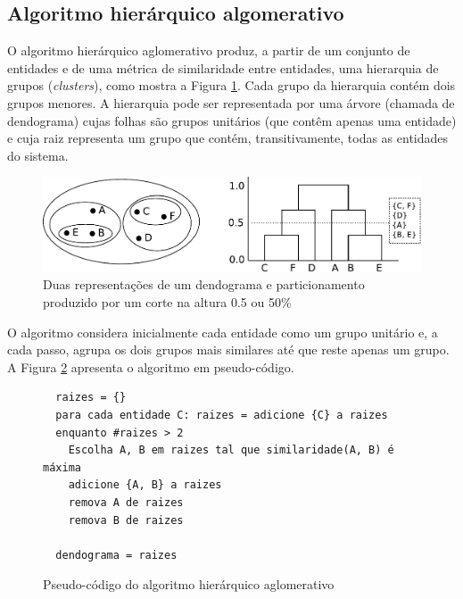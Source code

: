 \subsection{Algoritmo hierárquico algomerativo} \label{sec:aha}

O algoritmo hierárquico aglomerativo produz, a partir de um conjunto
de entidades e de uma métrica de similaridade entre entidades, uma hierarquia
de grupos (\emph{clusters}), como mostra a Figura \ref{fig:dendograma}. 
Cada grupo da hierarquia contém dois grupos menores.
A hierarquia pode ser
representada por uma árvore (chamada de dendograma) cujas folhas
são grupos unitários (que contêm apenas uma entidade) e cuja raiz
representa um grupo que contém, transitivamente, todas as entidades do
sistema.


\begin{figure}[ht] \label{fig:dendograma}
\begin{centering}
  \includegraphics[width=1.0\textwidth]{fig_dendograma}
  \caption{Duas representações de um dendograma e particionamento produzido
  por um corte na altura 0.5 ou 50\%}
\end{centering}
\end{figure}

O algoritmo considera inicialmente cada entidade como um grupo unitário e, a 
cada passo, agrupa os dois grupos mais similares até que reste apenas um
grupo. A Figura \ref{fig:algoritmo} apresenta o algoritmo em pseudo-código.

\begin{figure}[ht] \label{fig:algoritmo}
\begin{centering}
  \begin{verbatim}
  raizes = {}
  para cada entidade C: raizes = adicione {C} a raizes
  enquanto #raizes > 2
    Escolha A, B em raizes tal que similaridade(A, B) é máxima
    adicione {A, B} a raizes
    remova A de raizes
    remova B de raizes

  dendograma = raizes
  \end{verbatim}
  \caption{Pseudo-código do algoritmo hierárquico aglomerativo}
\end{centering}
\end{figure}

